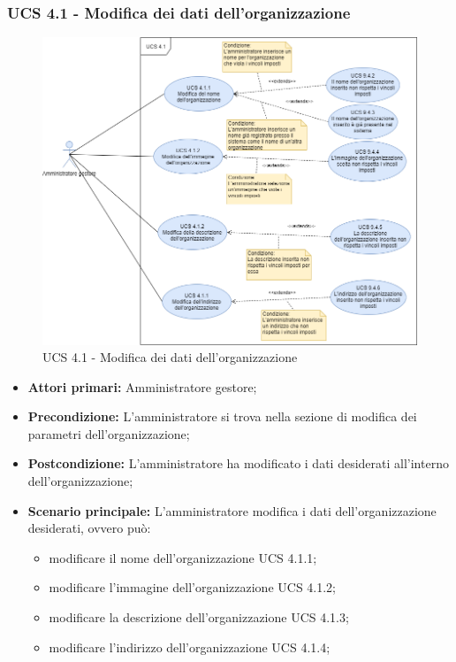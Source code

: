 \subsubsection{UCS 4.1 - Modifica dei dati dell'organizzazione}%
\begin{figure}[h]
	\centering
    \includegraphics[scale=0.53]{sezioni/UseCase/Immagini/UCS4.1.png}
    \caption{UCS 4.1 - Modifica dei dati dell'organizzazione}
\end{figure}
\begin{itemize}
    \item \textbf{Attori primari:} Amministratore gestore;
    \item \textbf{Precondizione:} L'amministratore si trova nella sezione di modifica dei parametri dell'organizzazione;
    \item \textbf{Postcondizione:} L'amministratore ha modificato i dati desiderati all'interno dell’organizzazione;
    \item \textbf{Scenario principale:} L'amministratore modifica i dati dell'organizzazione desiderati, ovvero può:
    \begin{itemize}
        \item modificare il nome dell'organizzazione UCS 4.1.1;
        \item modificare l'immagine dell'organizzazione UCS 4.1.2;
        \item modificare la descrizione dell'organizzazione UCS 4.1.3;
        \item modificare l'indirizzo dell'organizzazione UCS 4.1.4;
    \end{itemize}
\end{itemize}


